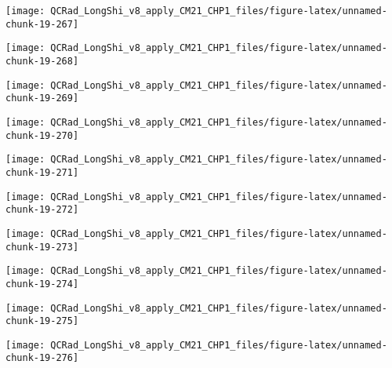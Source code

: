 \documentclass[
  10pt,
  a4paper,oneside]{article}
\begin{document}
\begin{center}\texttt{[image: QCRad\_LongShi\_v8\_apply\_CM21\_CHP1\_files/figure-latex/unnamed-chunk-19-267]} \end{center}

\begin{center}\texttt{[image: QCRad\_LongShi\_v8\_apply\_CM21\_CHP1\_files/figure-latex/unnamed-chunk-19-268]} \end{center}

\begin{center}\texttt{[image: QCRad\_LongShi\_v8\_apply\_CM21\_CHP1\_files/figure-latex/unnamed-chunk-19-269]} \end{center}

\begin{center}\texttt{[image: QCRad\_LongShi\_v8\_apply\_CM21\_CHP1\_files/figure-latex/unnamed-chunk-19-270]} \end{center}

\begin{center}\texttt{[image: QCRad\_LongShi\_v8\_apply\_CM21\_CHP1\_files/figure-latex/unnamed-chunk-19-271]} \end{center}

\begin{center}\texttt{[image: QCRad\_LongShi\_v8\_apply\_CM21\_CHP1\_files/figure-latex/unnamed-chunk-19-272]} \end{center}

\begin{center}\texttt{[image: QCRad\_LongShi\_v8\_apply\_CM21\_CHP1\_files/figure-latex/unnamed-chunk-19-273]} \end{center}

\begin{center}\texttt{[image: QCRad\_LongShi\_v8\_apply\_CM21\_CHP1\_files/figure-latex/unnamed-chunk-19-274]} \end{center}

\begin{center}\texttt{[image: QCRad\_LongShi\_v8\_apply\_CM21\_CHP1\_files/figure-latex/unnamed-chunk-19-275]} \end{center}

\begin{center}\texttt{[image: QCRad\_LongShi\_v8\_apply\_CM21\_CHP1\_files/figure-latex/unnamed-chunk-19-276]} \end{center}
\end{document}
